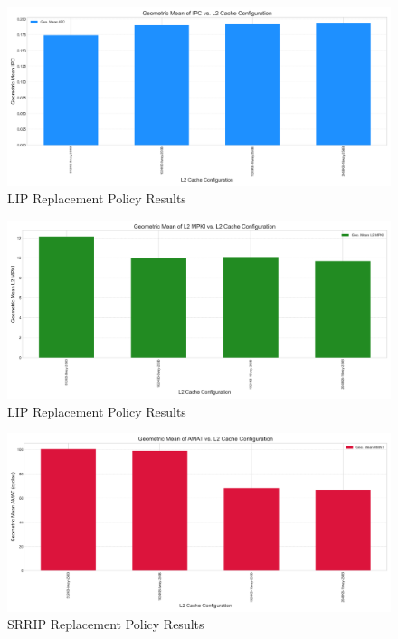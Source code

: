 \documentclass{article}
\begin{document}
\begin{figure}[H]
    \centering
    \includegraphics[width=\textwidth]{figures/lip/ipc_lip.png}
    \caption{LIP Replacement Policy Results}
    \label{fig:lip_ipc}
\end{figure}

\begin{figure}[H]
    \centering
    \includegraphics[width=\textwidth]{figures/lip/mpki_lip.png}
    \caption{LIP Replacement Policy Results}
    \label{fig:lip_mpki}
\end{figure}

\begin{figure}[H]
    \centering
    \includegraphics[width=\textwidth]{figures/srrip/amat_srrip.png}
    \caption{SRRIP Replacement Policy Results}
    \label{fig:srrip_amat}
\end{figure}
\end{document}
